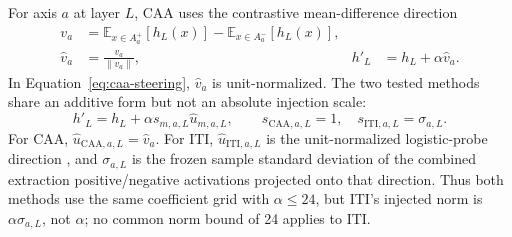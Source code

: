 \documentclass[sigconf]{acmart}
\begin{document}
For axis \(a\) at layer \(L\), CAA uses the contrastive mean-difference direction
\begin{equation}
  \begin{aligned}
    v_a
      &= \mathbb{E}_{x \in A_a^+}[h_L(x)]
       - \mathbb{E}_{x \in A_a^-}[h_L(x)], \\
    \hat v_a
      &= \frac{v_a}{\lVert v_a\rVert},
    & h'_L
      &= h_L + \alpha\hat v_a.
  \end{aligned}
  \label{eq:caa-steering}
\end{equation}
In Equation~\ref{eq:caa-steering}, \(\hat v_a\) is unit-normalized. The two tested methods share an additive form but not an absolute injection scale:
\begin{equation}
  h'_L=h_L+\alpha s_{m,a,L}\hat u_{m,a,L},
  \qquad
  s_{\mathrm{CAA},a,L}=1,\quad
  s_{\mathrm{ITI},a,L}=\sigma_{a,L}.
  \label{eq:method-specific-steering}
\end{equation}
For CAA, \(\hat u_{\mathrm{CAA},a,L}=\hat v_a\). For ITI, \(\hat u_{\mathrm{ITI},a,L}\) is the unit-normalized logistic-probe direction \cite{li2023iti}, and \(\sigma_{a,L}\) is the frozen sample standard deviation of the combined extraction positive/negative activations projected onto that direction. Thus both methods use the same coefficient grid with \(\alpha\le24\), but ITI's injected norm is \(\alpha\sigma_{a,L}\), not \(\alpha\); no common norm bound of 24 applies to ITI.
\end{document}
